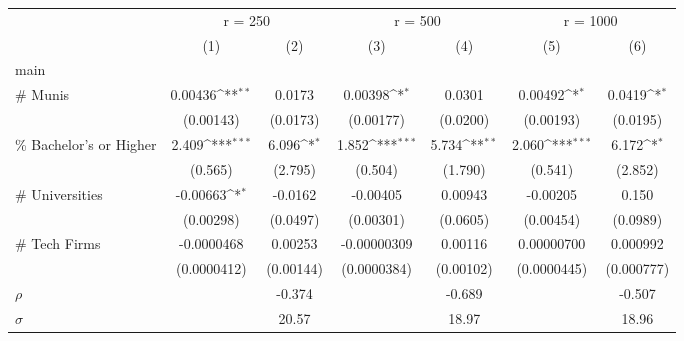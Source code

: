 {
\def\sym#1{\ifmmode^{#1}\else\(^{#1}\)\fi}
\begin{tabular}{l*{6}{c}}
\toprule
                    &\multicolumn{2}{c}{r = 250}                &\multicolumn{2}{c}{r = 500}                &\multicolumn{2}{c}{r = 1000}               \\
                    &\multicolumn{1}{c}{(1)}         &\multicolumn{1}{c}{(2)}         &\multicolumn{1}{c}{(3)}         &\multicolumn{1}{c}{(4)}         &\multicolumn{1}{c}{(5)}         &\multicolumn{1}{c}{(6)}         \\
\midrule
main                &                     &                     &                     &                     &                     &                     \\
\# Munis            &     0.00436\sym{**} &      0.0173         &     0.00398\sym{*}  &      0.0301         &     0.00492\sym{*}  &      0.0419\sym{*}  \\
                    &   (0.00143)         &    (0.0173)         &   (0.00177)         &    (0.0200)         &   (0.00193)         &    (0.0195)         \\
\addlinespace
\% Bachelor's or Higher&       2.409\sym{***}&       6.096\sym{*}  &       1.852\sym{***}&       5.734\sym{**} &       2.060\sym{***}&       6.172\sym{*}  \\
                    &     (0.565)         &     (2.795)         &     (0.504)         &     (1.790)         &     (0.541)         &     (2.852)         \\
\addlinespace
\# Universities     &    -0.00663\sym{*}  &     -0.0162         &    -0.00405         &     0.00943         &    -0.00205         &       0.150         \\
                    &   (0.00298)         &    (0.0497)         &   (0.00301)         &    (0.0605)         &   (0.00454)         &    (0.0989)         \\
\addlinespace
\# Tech Firms       &  -0.0000468         &     0.00253         & -0.00000309         &     0.00116         &  0.00000700         &    0.000992         \\
                    & (0.0000412)         &   (0.00144)         & (0.0000384)         &   (0.00102)         & (0.0000445)         &  (0.000777)         \\
\midrule
\(\rho\)            &                     &      -0.374         &                     &      -0.689         &                     &      -0.507         \\
\(\sigma\)          &                     &       20.57         &                     &       18.97         &                     &       18.96         \\

\end{tabular}}

